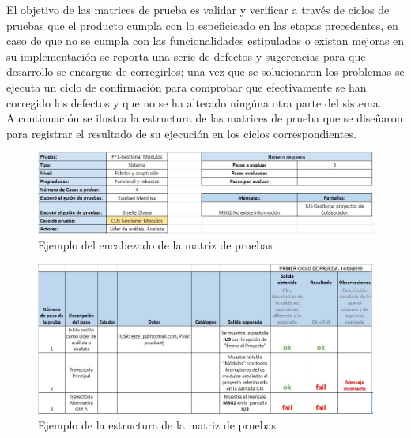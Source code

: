 El objetivo de las matrices de prueba es validar y verificar a través de ciclos de pruebas que el producto cumpla con lo espeficicado en las etapas precedentes, en caso de que no se cumpla con las funcionalidades estipuladas o existan mejoras en su implementación se reporta una serie de defectos y sugerencias para que desarrollo se encargue de corregirlos; una vez que se solucionaron los problemas se ejecuta un ciclo de confirmación para comprobar que efectivamente se han corregido los defectos y que no se ha alterado ningúna otra parte del sistema.\\

A continuación se ilustra la estructura de las matrices de prueba que se diseñaron para registrar el resultado de su ejecución en los ciclos correspondientes.\\

\begin{figure}[H]
	\begin{center}
		\includegraphics[width=.95\textwidth]{images/pruebas/diseno/encabezado}
		\caption{Ejemplo del encabezado de la matriz de pruebas}
		\label{fig:encabezado}
	\end{center}
\end{figure}

\begin{figure}[H]
	\begin{center}
		\includegraphics[width=.95\textwidth]{images/pruebas/diseno/tabla}
		\caption{Ejemplo de la estructura de la matriz de pruebas}
		\label{fig:estructura}
	\end{center}
\end{figure}

